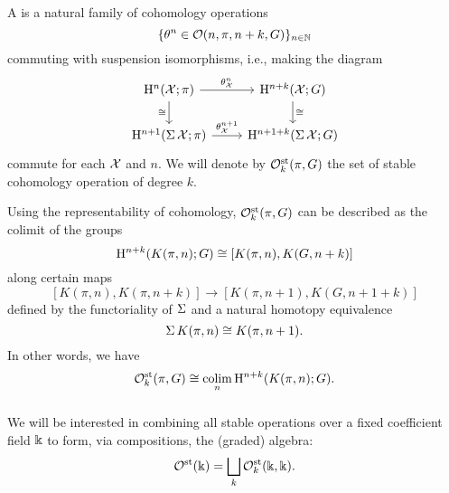 \subsubsection{}

A  is a natural family of cohomology operations
\[
\{\theta^n \in \mathcal{O}(n,\pi,n+k,G)\}_{n \in \mathbb{N}}
\]
commuting with suspension isomorphisms, i.e., making the diagram
\[
\begin{tikzcd}
	\rH^n(\cX; \pi) \rar["\theta^n_\cX"] \dar["\cong" left] & \rH^{n+k}(\cX; G) \dar["\cong" right] \\
	\rH^{n+1}(\sus \cX; \pi) \rar["\theta^{n+1}_\cX"] & \rH^{n+1+k}(\sus \cX; G)
\end{tikzcd}
\]
commute for each \(\mathcal{X}\) and $n$.
We will denote by $\mathcal{O}^{\mathrm{st}}_k(\pi, G)$ the set of stable cohomology operation of degree $k$.


Using the representability of cohomology, $\mathcal{O}^{\mathrm{st}}_k(\pi, G)$ can be described as the colimit of the groups
\[
\mathrm{H}^{n+k}(K(\pi, n); G) \cong [K(\pi, n), K(G, n+k)]
\]
along certain maps
\[
[K(\pi, n), K(\pi, n+k)] \to [K(\pi, n+1), K(G, n+1+k)]
\]
defined by the functoriality of $\operatorname{\Sigma}$ and a natural homotopy equivalence
\begin{equation}\label{eq:suspension of K(pi,n)}
	\operatorname{\Sigma} K(\pi, n) \cong K(\pi, n+1).
\end{equation}
In other words, we have
\[
\mathcal{O}^{\mathrm{st}}_k(\pi, G) \cong \operatorname*{colim}_n \mathrm{H}^{n+k}(K(\pi, n); G).
\]

\subsubsection{} We will be interested in combining all stable operations over a fixed coefficient field $\Bbbk$ to form, via compositions, the (graded) algebra:
\[
\mathcal{O}^{\mathrm{st}}(\Bbbk) = \bigsqcup_k \mathcal{O}^{\mathrm{st}}_k(\Bbbk, \Bbbk).
\]

